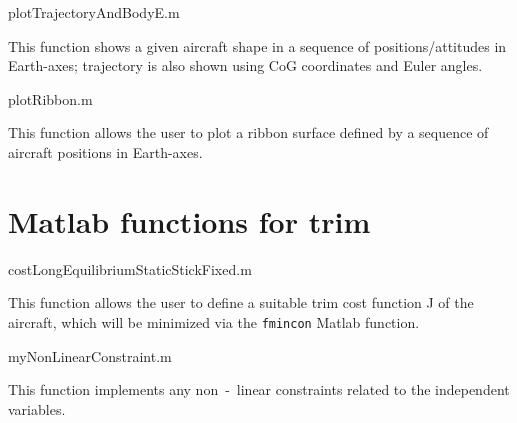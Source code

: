\documentclass[[12pt,twoside]{book}
\begin{document}
    
%
    {plotTrajectoryAndBodyE.m}
    
    This function shows a given aircraft shape in a sequence of positions/attitudes in Earth-axes; trajectory is also shown using CoG coordinates and Euler angles.
    


    
    
%
    {plotRibbon.m}
    
    This function allows the user to plot a ribbon surface defined by a sequence of aircraft positions in Earth-axes.
    
    

    
    
    
    \chapter%
   [Matlab functions for trim]%
   {Matlab functions for trim}
\label{chap:Appendix:Matlab:Trim}


%
    {costLongEquilibriumStaticStickFixed.m}

    This function allows the user to define a suitable trim cost function J of the aircraft, which will be minimized via the \lstinline[basicstyle=\ttfamily]{fmincon} Matlab function.

%
    {myNonLinearConstraint.m}

    This function implements any non~-~linear constraints related to the independent variables.
\end{document}
